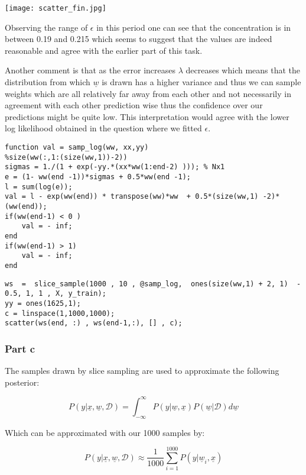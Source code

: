 \documentclass[11pt]{article}
\begin{document}
\texttt{[image: scatter\_fin.jpg]}


Observing the range of $\epsilon$ in this period one can see that the concentration is in between 0.19 and 0.215 which seems to suggest that the values are indeed reasonable and agree with the earlier part of this task.

Another comment is that as the error increases $\lambda$ decreases which means that the distribution from which $\underline{w}$ is drawn has a higher variance and thus we can sample weights which are all relatively far away from each other and not necessarily in agreement with each other prediction wise  thus the confidence over our predictions might be quite low. This interpretation would agree with the lower log likelihood obtained in the question where we fitted $\epsilon$.

\begin{lstlisting}
function val = samp_log(ww, xx,yy)
%size(ww(:,1:(size(ww,1))-2))
sigmas = 1./(1 + exp(-yy.*(xx*ww(1:end-2) ))); % Nx1
e = (1- ww(end -1))*sigmas + 0.5*ww(end -1);
l = sum(log(e));
val = l - exp(ww(end)) * transpose(ww)*ww  + 0.5*(size(ww,1) -2)*(ww(end));
if(ww(end-1) < 0 )
    val = - inf;
end
if(ww(end-1) > 1)
    val = - inf;
end

\end{lstlisting}

\begin{lstlisting}
ws  =  slice_sample(1000 , 10 , @samp_log,  ones(size(ww,1) + 2, 1)  - 0.5, 1, 1 , X, y_train);
yy = ones(1625,1);
c = linspace(1,1000,1000);
scatter(ws(end, :) , ws(end-1,:), [] , c);
\end{lstlisting}
\subsubsection{Part c}


The samples drawn by slice sampling are used to approximate the following posterior:

\[
P(y|\underline{x}, \underline{w}, \mathcal{D}) = \int_{-\infty}^{\infty}P(y|\underline{w}, \underline{x})P(\underline{w}| \mathcal{D} )d\underline{w}
\]

Which can be approximated with our 1000 samples by:

\[
P(y|\underline{x}, \underline{w}, \mathcal{D}) \approx \frac{1}{1000}\sum_{i=1}^{1000}P(y|\underline{w}_{i}, \underline{x})
\]
\end{document}
